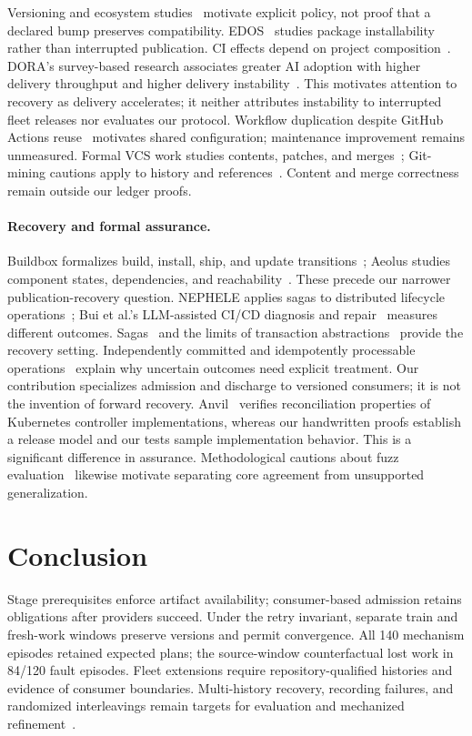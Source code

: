 Versioning and ecosystem studies~\cite{raemaekers,bogart,decan} motivate explicit
policy, not proof that a declared bump preserves compatibility.
EDOS~\cite{edos} studies package installability rather than interrupted
publication. CI effects depend on project composition~\cite{huangci}.
DORA's survey-based research associates
greater AI adoption with higher delivery throughput and higher delivery
instability~\cite{dora2025}. This motivates attention to recovery as delivery
accelerates; it neither attributes instability to interrupted fleet releases
nor evaluates our protocol. Workflow duplication despite GitHub
Actions reuse~\cite{cardoen} motivates shared configuration; maintenance
improvement remains unmeasured. Formal VCS work studies contents, patches, and
merges~\cite{swierstraloh,hpt,mimram,mrdt}; Git-mining cautions apply to history
and references~\cite{birdgit}. Content and merge correctness remain outside our
ledger proofs.

\paragraph{Recovery and formal assurance.}
Buildbox formalizes build, install, ship, and update transitions~\cite{liusmith};
Aeolus studies component states, dependencies, and reachability~\cite{aeolus}.
These precede our narrower publication-recovery question. NEPHELE applies
sagas to distributed lifecycle operations~\cite{nephele}; Bui et al.'s
LLM-assisted CI/CD diagnosis and repair~\cite{bui} measures different outcomes.
Sagas~\cite{sagas} and the limits of transaction abstractions~\cite{gray}
provide the recovery setting. Independently committed and idempotently
processable operations~\cite{helland07,helland12} explain why uncertain
outcomes need explicit treatment. Our contribution specializes admission and
discharge to versioned consumers; it is not the invention of forward recovery.
Anvil~\cite{anvil} verifies reconciliation properties of Kubernetes controller
implementations, whereas our handwritten proofs establish a release model and
our tests sample implementation behavior. This is a significant difference
in assurance. Methodological cautions about fuzz evaluation~\cite{klees}
likewise motivate separating core agreement from unsupported generalization.

\section{Conclusion}
\label{sec:conclusion}
Stage prerequisites enforce artifact availability; consumer-based admission
retains obligations after providers succeed. Under the retry invariant,
separate train and fresh-work windows preserve versions and permit convergence.
All 140 mechanism episodes retained expected plans; the source-window
counterfactual lost work in 84/120 fault episodes. Fleet extensions require
repository-qualified histories and evidence of consumer boundaries.
Multi-history recovery, recording failures, and randomized interleavings
remain targets for evaluation and mechanized refinement~\cite{lamport}.


